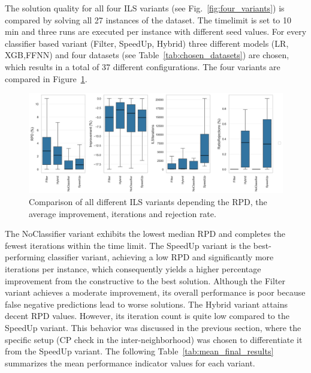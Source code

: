 The solution quality for all four \gls{ILS} variants (see Fig.~\ref{fig:four_variants}) is compared by solving all 27 instances of the
\gendreauDataSetText dataset. The timelimit is set to 10 min and three runs are executed per instance with different seed values.
For every classifier based variant (Filter, SpeedUp, Hybrid) three different models (\gls{LR}, \gls{XGB},\gls{FFNN}) and four datasets
(see Table~\ref{tab:chosen_datasets}) are chosen, which results in a total of 37 different configurations. The four variants are compared
in Figure~\ref{fig:boxplots_final_comparison}.
\begin{figure}[!ht]
	\centering
	\includegraphics[width =\textwidth]{pictures/final_results/LoadingCheckerType_boxplot_final_results.png}
	\caption{Comparison of all different ILS variants depending the RPD, the average improvement, iterations and rejection rate.}
	\label{fig:boxplots_final_comparison}
\end{figure}
The NoClassifier variant exhibits the lowest median \gls{RPD} and completes the fewest iterations within the time limit.
The SpeedUp variant is the best-performing classifier variant, achieving a low \gls{RPD} and significantly more iterations per
instance, which consequently yields a higher percentage improvement from the constructive to the best solution.
Although the Filter variant achieves a moderate improvement, its overall performance is poor because false negative predictions
lead to worse solutions. The Hybrid variant attains decent \gls{RPD} values. However, its iteration count is quite low
compared to the SpeedUp variant. This behavior was discussed in the previous section, where the specific setup (\gls{CP} check in the inter-neighborhood)
was chosen to differentiate it from the SpeedUp variant. The following Table~\ref{tab:mean_final_results}
summarizes the mean performance indicator values for each variant.
